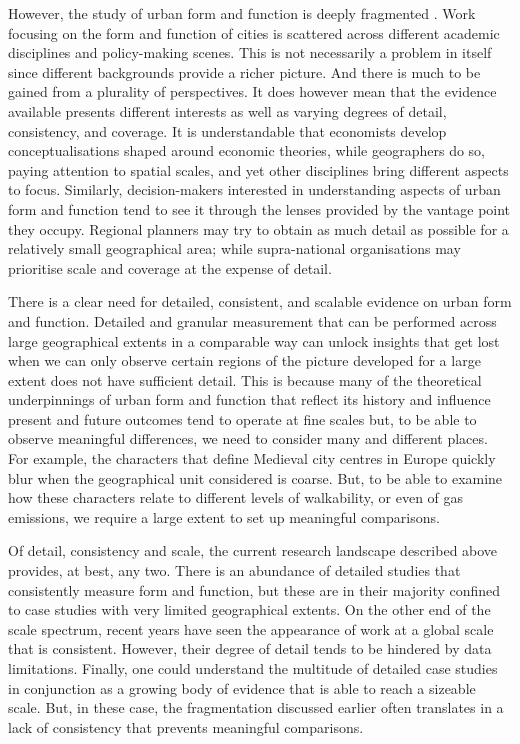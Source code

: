 However, the study of urban form and function is deeply fragmented \citep{kropf2014ambiguity,brenner2015towards,gauthier2006mapping}.
Work focusing on the form and function of cities is scattered across
different academic disciplines and policy-making scenes. This is not
necessarily a problem in itself since different backgrounds
provide a richer picture. And there is much to be gained from a plurality of
perspectives.
%
It does however mean that the evidence available presents different
interests as well as varying degrees of detail, consistency, and coverage.
It is understandable that economists develop conceptualisations shaped around
economic theories, while geographers do so, paying attention to spatial scales,
and yet other disciplines bring different aspects to focus.
Similarly, decision-makers interested in understanding aspects of urban form
and function tend to see it through the lenses provided by the vantage point
they occupy. Regional planners may try to obtain as much detail as
possible for a relatively small geographical area; while supra-national
organisations may prioritise scale and coverage at the expense of detail.

There is a clear need for detailed, consistent, and scalable evidence on urban
form and function.
Detailed and granular measurement that can be performed across large
geographical extents in a comparable way can unlock insights that get lost
when we can only observe certain regions of the picture developed for a large
extent does not have sufficient detail.
%
This is because many of the
theoretical underpinnings of urban form and function that reflect its history
and influence present and future outcomes tend to operate at fine scales but,
to be able to observe meaningful differences, we need to consider many and
different places.
%
For example, the characters that define Medieval city centres in Europe
quickly blur when the geographical unit considered is coarse. But, to be able to
examine how these characters relate to different levels of walkability, or
even of gas emissions, we require a large extent to set up meaningful
comparisons.

Of detail, consistency and scale, the current research landscape described above
provides, at best, any two.
%
There is an abundance of detailed studies that consistently measure form and
function, but these are in their majority confined to case studies with very
limited geographical extents.
%
On the other end of the scale spectrum, recent years have seen the appearance
of work at a global scale that is consistent. However, their degree of detail
tends to be hindered by data limitations.
%
Finally, one could understand the multitude of detailed case studies in
conjunction as a growing body of evidence that is able to reach a sizeable
scale. But, in these case, the fragmentation discussed earlier often
translates in a lack of consistency that prevents meaningful comparisons.

